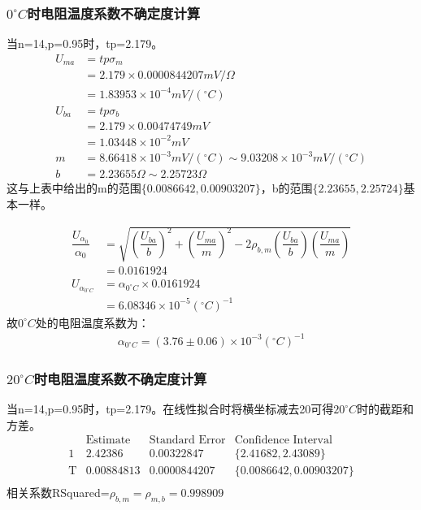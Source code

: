 \documentclass[UEF8]{ctexart}
\begin{document}
\begin{multicols}{2}
\subsubsection{$0^\circ{C}$时电阻温度系数不确定度计算}
	当n=14,p=0.95时，tp=2.179。
\begin{equation*}
\begin{aligned}
U_{ma}&=tp\sigma_{m} \\
& = 2.179\times{0.0000844207mV/\Omega} \\
& =1.83953\times10^{-4}mV/(^\circ{C})\\
U_{ba}&=tp\sigma_{b} \\
& = 2.179\times{0.00474749mV} \\
& =1.03448\times10^{-2}mV \\
m&=8.66418\times10^{-3}mV/(^\circ{C})\sim9.03208\times10^{-3}mV/(^\circ{C}) \\
b&=2.23655\Omega\sim2.25723\Omega 
\end{aligned}
\end{equation*}
这与上表中给出的m的范围$\{0.0086642,0.00903207\}$，b的范围$\{2.23655,2.25724\}$基本一样。

\begin{equation*}
\begin{aligned}
\dfrac{U_{\alpha_{0}}}{\alpha_{0}}&=\sqrt{(\dfrac{U_{ba}}{b})^2+(\dfrac{U_{ma}}{m})^2-2\rho_{b,m}(\dfrac{U_{ba}}{b})(\dfrac{U_{ma}}{m})} \\
&=0.0161924 \\
U_{\alpha_{0^\circ{C}}}&=\alpha_{0^\circ{C}}\times 0.0161924 \\
&=6.08346\times 10^{-5}(^\circ{C})^{-1}
\end{aligned}
\end{equation*}
故$0^\circ{C}$处的电阻温度系数为：
\begin{equation*}
\begin{aligned}
\alpha_{0^\circ{C}}=(3.76\pm 0.06)\times 10^{-3}(^\circ{C})^{-1}
\end{aligned}
\end{equation*}

\subsubsection{$20^\circ{C}$时电阻温度系数不确定度计算}
当n=14,p=0.95时，tp=2.179。在线性拟合时将横坐标减去20可得$20^\circ{C}$时的截距和方差。
\small
$$
\begin{array}{l|lll}
	\text{} & \text{Estimate} & \text{Standard Error} & \text{Confidence Interval} \\
	\hline
	1 & 2.42386 & 0.00322847 & \{2.41682,2.43089\} \\
	\text{T} & 0.00884813 & 0.0000844207 & \{0.0086642,0.00903207\} \\
\end{array}
$$
相关系数RSquared=$\rho_{b,m}=\rho_{m,b}=0.998909$
\normalsize


\end{multicols}
\end{document}
